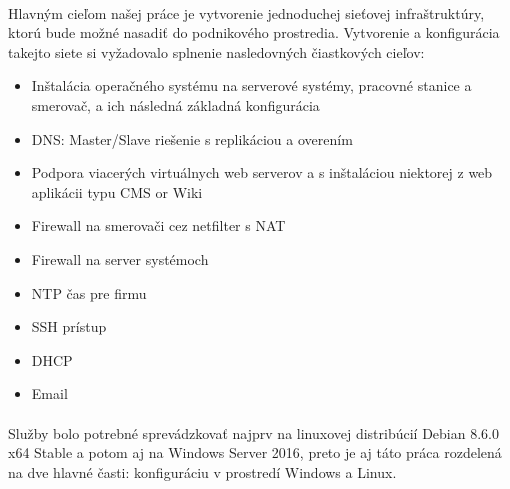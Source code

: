 \paragraph{}
Hlavným cieľom našej práce je vytvorenie jednoduchej sieťovej infraštruktúry, ktorú bude možné nasadiť do podnikového prostredia. Vytvorenie a konfigurácia takejto siete si vyžadovalo splnenie nasledovných čiastkových cieľov:
\begin{itemize}
\item Inštalácia operačného systému na serverové systémy, pracovné stanice a smerovač, a ich následná základná konfigurácia
\item DNS: Master/Slave riešenie s replikáciou a overením
\item Podpora viacerých virtuálnych web serverov a s inštaláciou niektorej z web aplikácii typu CMS or Wiki
\item Firewall na smerovači cez  netfilter s NAT
\item Firewall na server systémoch
\item NTP čas pre firmu
\item SSH prístup
\item DHCP
\item Email
\end{itemize}
\paragraph{}
Služby bolo potrebné sprevádzkovať najprv na linuxovej distribúcií Debian 8.6.0 x64 Stable a potom aj na Windows Server 2016, preto je aj táto práca rozdelená na dve hlavné časti: konfiguráciu v prostredí Windows a Linux.
